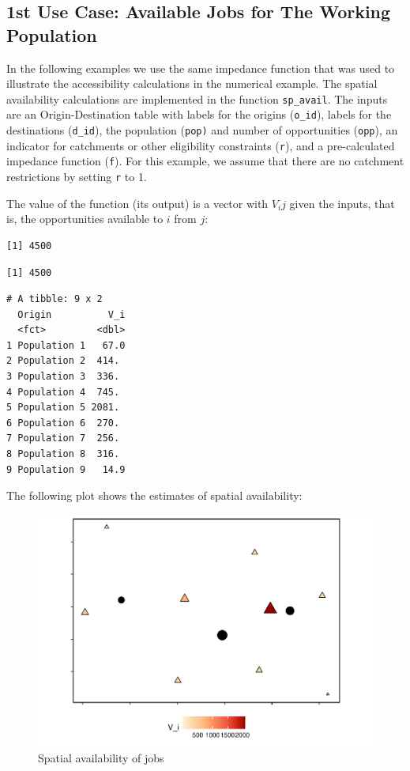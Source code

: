 \documentclass[]{elsarticle} %
\begin{document}
\hypertarget{st-use-case-available-jobs-for-the-working-population}{%
\subsection{1st Use Case: Available Jobs for The Working
Population}\label{st-use-case-available-jobs-for-the-working-population}}

In the following examples we use the same impedance function that was
used to illustrate the accessibility calculations in the numerical
example. The spatial availability calculations are implemented in the
function \texttt{sp\_avail}. The inputs are an Origin-Destination table
with labels for the origins (\texttt{o\_id}), labels for the
destinations (\texttt{d\_id}), the population (\texttt{pop)} and number
of opportunities (\texttt{opp}), an indicator for catchments or other
eligibility constraints (\texttt{r}), and a pre-calculated impedance
function (\texttt{f}). For this example, we assume that there are no
catchment restrictions by setting \texttt{r} to 1.

The value of the function (its output) is a vector with \(V_ij\) given
the inputs, that is, the opportunities available to \(i\) from \(j\):

\begin{verbatim}
[1] 4500
\end{verbatim}

\begin{verbatim}
[1] 4500
\end{verbatim}

\begin{verbatim}
# A tibble: 9 x 2
  Origin          V_i
  <fct>         <dbl>
1 Population 1   67.0
2 Population 2  414. 
3 Population 3  336. 
4 Population 4  745. 
5 Population 5 2081. 
6 Population 6  270. 
7 Population 7  256. 
8 Population 8  316. 
9 Population 9   14.9
\end{verbatim}

The following plot shows the estimates of spatial availability:

\begin{figure}
\includegraphics[width=1\linewidth]{Spatial-Availability_files/figure-latex/toy-example-availability-jobs-1} \caption{\label{fig:toy-example-availability-jobs}Spatial availability of jobs}\label{fig:toy-example-availability-jobs}
\end{figure}
\end{document}
